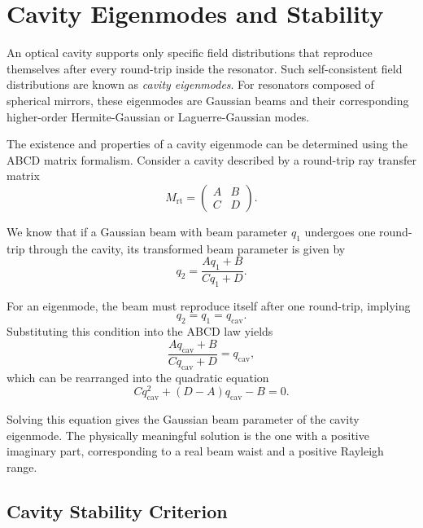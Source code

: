 \documentclass{report}
\begin{document}
\section{Cavity Eigenmodes and Stability}
An optical cavity supports only specific field distributions that reproduce themselves after every round-trip inside the resonator. Such self-consistent field distributions are known as \textit{cavity eigenmodes}. For resonators composed of spherical mirrors, these eigenmodes are Gaussian beams and their corresponding higher-order Hermite-Gaussian or Laguerre-Gaussian modes.

The existence and properties of a cavity eigenmode can be determined using the ABCD matrix formalism. Consider a cavity described by a round-trip ray transfer matrix
\begin{equation}
M_{\mathrm{rt}}
=
\begin{pmatrix}
A & B \\
C & D
\end{pmatrix}.
\end{equation}

We know that if a Gaussian beam with beam parameter $q_1$ undergoes one round-trip through the cavity, its transformed beam parameter is given by
\begin{equation}
q_2
=
\frac{Aq_1+B}
     {Cq_1+D}.
\end{equation}

For an eigenmode, the beam must reproduce itself after one round-trip, implying
\begin{equation}
q_2=q_1=q_{\mathrm{cav}}.
\end{equation}
Substituting this condition into the ABCD law yields
\begin{equation}
\frac{Aq_{\mathrm{cav}}+B}
     {Cq_{\mathrm{cav}}+D}
=
q_{\mathrm{cav}},
\end{equation}
which can be rearranged into the quadratic equation
\begin{equation}
Cq_{\mathrm{cav}}^{2}
+
(D-A)q_{\mathrm{cav}}
-
B
=
0.
\end{equation}

Solving this equation gives the Gaussian beam parameter of the cavity eigenmode. The physically meaningful solution is the one with a positive imaginary part, corresponding to a real beam waist and a positive Rayleigh range.

\subsection{Cavity Stability Criterion}
\end{document}
